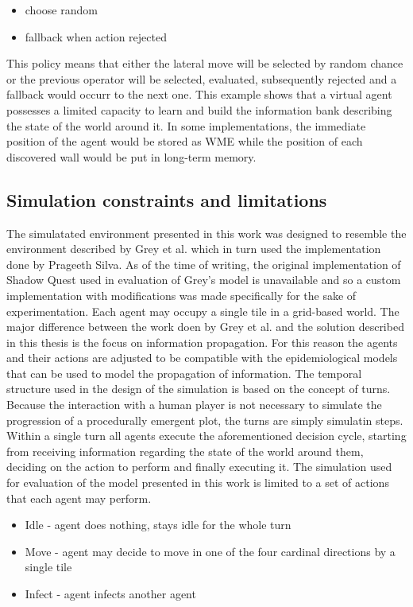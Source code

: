 \begin{itemize}
    \item choose random
    \item fallback when action rejected
\end{itemize}

This policy means that either the lateral move will be selected by random chance or the previous operator will be selected, evaluated, subsequently rejected and a fallback would occurr to the next one.
This example shows that a virtual agent possesses a limited capacity to learn and build the information bank describing the state of the world around it.
In some implementations, the immediate position of the agent would be stored as WME while the position of each discovered wall would be put in long-term memory.

\subsection{Simulation constraints and limitations}

The simulatated environment presented in this work was designed to resemble the environment described by Grey et al.\cite{grey2011procedural} which in turn used the implementation done by Prageeth Silva\cite{silva2010shadow}.
As of the time of writing, the original implementation of Shadow Quest used in evaluation of Grey's model is unavailable and so a custom implementation with modifications was made specifically for the sake of experimentation.
Each agent may occupy a single tile in a grid-based world.
The major difference between the work doen by Grey et al. and the solution described in this thesis is the focus on information propagation.
For this reason the agents and their actions are adjusted to be compatible with the epidemiological models that can be used to model the propagation of information.
The temporal structure used in the design of the simulation is based on the concept of turns.
Because the interaction with a human player is not necessary to simulate the progression of a procedurally emergent plot, the turns are simply simulatin steps.
Within a single turn all agents execute the aforementioned decision cycle, starting from receiving information regarding the state of the world around them, deciding on the action to perform and finally executing it.
The simulation used for evaluation of the model presented in this work is limited to a set of actions that each agent may perform.

\begin{itemize}
    \item Idle - agent does nothing, stays idle for the whole turn
    \item Move - agent may decide to move in one of the four cardinal directions by a single tile
    \item Infect - agent infects another agent
\end{itemize}

